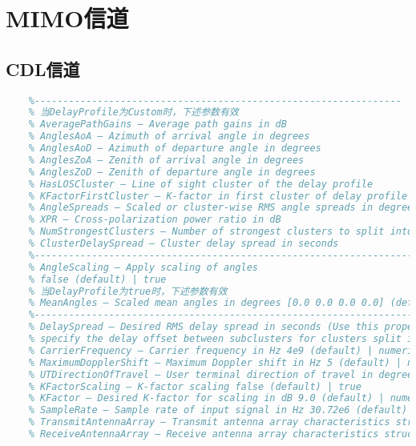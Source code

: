\section{MIMO信道}
\subsection{CDL信道}
\begin{lstlisting}[language={matlab}]
    % DelayProfile: 时延谱，可选'CDL-A' (default) | 'CDL-B' | 'CDL-C' | 'CDL-D' | 'CDL-E' | 'Custom'
    %----------------------------------------------------------------
    % 当DelayProfile为Custom时，下述参数有效
    % AveragePathGains — Average path gains in dB
    % AnglesAoA — Azimuth of arrival angle in degrees
    % AnglesAoD — Azimuth of departure angle in degrees
    % AnglesZoA — Zenith of arrival angle in degrees
    % AnglesZoD — Zenith of departure angle in degrees
    % HasLOSCluster — Line of sight cluster of the delay profile
    % KFactorFirstCluster — K-factor in first cluster of delay profile in dB
    % AngleSpreads — Scaled or cluster-wise RMS angle spreads in degrees（to enable this property, set DelayProfile to 'Custom' or AngleScaling to true.）
    % XPR — Cross-polarization power ratio in dB
    % NumStrongestClusters — Number of strongest clusters to split into subclusters 0 (default) | numeric scalar
    % ClusterDelaySpread — Cluster delay spread in seconds
    %-------------------------------------------------------------------
    % AngleScaling — Apply scaling of angles
    % false (default) | true
    % 当DelayProfile为true时，下述参数有效
    % MeanAngles — Scaled mean angles in degrees [0.0 0.0 0.0 0.0] (default) | four-element row vector
    %------------------------------------------------------------------
    % DelaySpread — Desired RMS delay spread in seconds (Use this property to
    % specify the delay offset between subclusters for clusters split into subclusters. See TR 38.901 Section 7.5, Step 11.)
    % CarrierFrequency — Carrier frequency in Hz 4e9 (default) | numeric scalar
    % MaximumDopplerShift — Maximum Doppler shift in Hz 5 (default) | nonnegative numeric scalar
    % UTDirectionOfTravel — User terminal direction of travel in degrees
    % KFactorScaling — K-factor scaling false (default) | true
    % KFactor — Desired K-factor for scaling in dB 9.0 (default) | numeric scalar
    % SampleRate — Sample rate of input signal in Hz 30.72e6 (default) | positive numeric scalar
    % TransmitAntennaArray — Transmit antenna array characteristics structure
    % ReceiveAntennaArray — Receive antenna array characteristics structure

\end{lstlisting}
